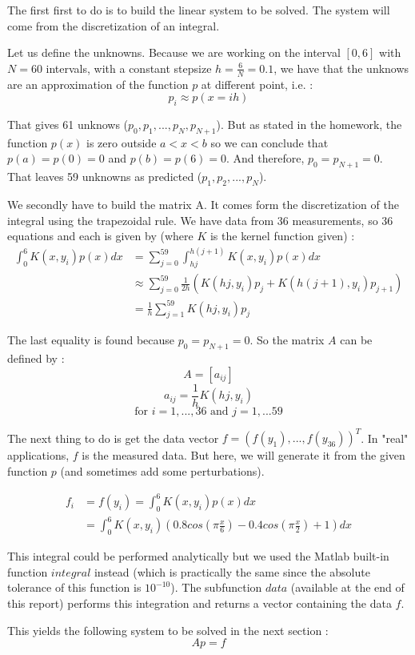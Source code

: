 The first first to do is to build the linear system to be solved. The system will come from the discretization of an integral. 

Let us define the unknowns. Because we are working on the interval $[0,6]$ with $N=60$ intervals, with a constant stepsize $h=\frac{6}{N}=0.1$, we have that the unknows are an approximation of the function $p$ at different point, i.e. : 
$$p_i \approx p(x=ih)$$

That gives 61 unknows ($p_0,p_1,...,p_N,p_{N+1}$). But as stated in the homework, the function $p(x)$ is zero outside $a<x<b$ so we can conclude that $p(a)=p(0)=0$ and $p(b)=p(6)=0$. And therefore, $p_0=p_{N+1}=0$. That leaves 59 unknowns as predicted ($p_1,p_2,...,p_N$).

We secondly have to build the matrix A. It comes form the discretization of the integral using the trapezoidal rule. We have data from 36 measurements, so 36 equations and each is given by (where $K$ is the kernel function given) : 
\begin{align*}
\int_0^{6}K(x,y_i)p(x)dx &=\sum_{j=0}^{59} \int^{h(j+1)}_{hj} K(x,y_i)p(x)dx\\
&\approx \sum_{j=0}^{59} \frac{1}{2h}(K(hj,y_i)p_j+K(h(j+1),y_i)p_{j+1})\\
&=\frac{1}{h}\sum_{j=1}^{59} K(hj,y_i)p_j
\end{align*}

The last equality is found because $p_0=p_{N+1}=0$. So the matrix $A$ can be defined by : 
$$A=[a_{ij}]$$
$$a_{ij} = \frac{1}{h}K(hj,y_i)$$
$$\text{for }i=1,...,36 \text{ and }j=1,...59$$

The next thing to do is get the data vector $f=(f(y_1),...,f(y_{36}))^T$. In "real" applications, $f$ is the measured data. But here, we will generate it from the given function $p$ (and sometimes add some perturbations).

\begin{align*}
f_i&=f(y_i)=\int_0^{6}K(x,y_i)p(x)dx\\
&=\int_0^{6}K(x,y_i)(0.8cos(\pi\frac{x}{6})-0.4cos(\pi\frac{x}{2})+1)dx
\end{align*}

This integral could be performed analytically but we used the Matlab built-in function $integral$ instead (which is practically the same since the absolute tolerance of this function is $10^{-10}$). The subfunction $data$ (available at the end of this report) performs this integration and returns a vector containing the data $f$.

This yields the following system to be solved in the next section : 
$$Ap=f$$